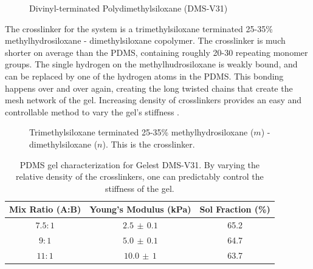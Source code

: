 \begin{figure}[h!]
	\centering
	\label{fig:DMS-V31}
	\caption[DMS-V31]{Divinyl-terminated Polydimethylsiloxane (DMS-V31)}
\end{figure}
\noindent The crosslinker for the system is a trimethylsiloxane terminated 25-35\% methylhydrosiloxane - dimethylsiloxane copolymer. The crosslinker is much shorter on average than the PDMS, containing roughly 20-30 repeating monomer groups. The single hydrogen on the methylhudrosiloxane is weakly bound, and can be replaced by one of the hydrogen atoms in the PDMS. This bonding happens over and over again, creating the long twisted chains that create the mesh network of the gel. Increasing density of crosslinkers provides an easy and controllable method to vary the gel's stiffness \cite{Andreotti2020}.

\begin{figure}
	\centering
	\label{fig:HMS-301}
	\caption[HMS-301]{Trimethylsiloxane terminated 25-35\% methylhydrosiloxane ($m$) - dimethylsiloxane ($n$). This is the crosslinker.}
\end{figure}

\begin{table}[h!]
	\begin{center}
		\begin{tabular}{|c||c||c|}
			\hline
			Mix Ratio (A:B) & Young's Modulus (kPa) & Sol Fraction (\%)\\
			\hline
			$7.5:1$ & $2.5 \,\pm\, 0.1$ & 65.2\\
			\hline
			$9:1$ & $5.0 \, \pm\, 0.1$  & 64.7\\
			\hline
			$11:1$ & $10.0 \,\pm\, 1$  & 63.7\\
			\hline
		\end{tabular}
	\end{center}
	\label{tab:recipes}
	\caption[PDMS ratios Characterization]{PDMS gel characterization for Gelest DMS-V31. By varying the relative density of the crosslinkers, one can predictably control the stiffness of the gel.}
\end{table}




